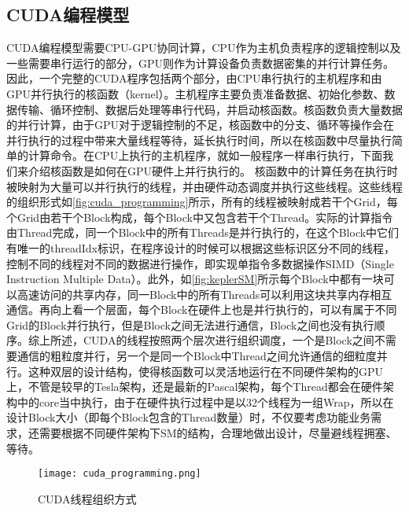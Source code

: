 \subsection{CUDA编程模型}
CUDA编程模型需要CPU-GPU协同计算，CPU作为主机负责程序的逻辑控制以及一些需要串行运行的部分，GPU则作为计算设备负责数据密集的并行计算任务。因此，一个完整的CUDA程序包括两个部分，由CPU串行执行的主机程序和由GPU并行执行的核函数（kernel）。主机程序主要负责准备数据、初始化参数、数据传输、循环控制、数据后处理等串行代码，并启动核函数。核函数负责大量数据的并行计算，由于GPU对于逻辑控制的不足，核函数中的分支、循环等操作会在并行执行的过程中带来大量线程等待，延长执行时间，所以在核函数中尽量执行简单的计算命令。在CPU上执行的主机程序，就如一般程序一样串行执行，下面我们来介绍核函数是如何在GPU硬件上并行执行的。
核函数中的计算任务在执行时被映射为大量可以并行执行的线程，并由硬件动态调度并执行这些线程。这些线程的组织形式如\autoref{fig:cuda_programming}所示，所有的线程被映射成若干个Grid，每个Grid由若干个Block构成，每个Block中又包含若干个Thread。实际的计算指令由Thread完成，同一个Block中的所有Threads是并行执行的，在这个Block中它们有唯一的threadIdx标识，在程序设计的时候可以根据这些标识区分不同的线程，控制不同的线程对不同的数据进行操作，即实现单指令多数据操作SIMD（Single Instruction Multiple Data）。此外，如\autoref{fig:keplerSM}所示每个Block中都有一块可以高速访问的共享内存，同一Block中的所有Threads可以利用这块共享内存相互通信。再向上看一个层面，每个Block在硬件上也是并行执行的，可以有属于不同Grid的Block并行执行，但是Block之间无法进行通信，Block之间也没有执行顺序。综上所述，CUDA的线程按照两个层次进行组织调度，一个是Block之间不需要通信的粗粒度并行，另一个是同一个Block中Thread之间允许通信的细粒度并行。这种双层的设计结构，使得核函数可以灵活地运行在不同硬件架构的GPU上，不管是较早的Tesla架构，还是最新的Pascal架构，每个Thread都会在硬件架构中的core当中执行，由于在硬件执行过程中是以32个线程为一组Wrap，所以在设计Block大小（即每个Block包含的Thread数量）时，不仅要考虑功能业务需求，还需要根据不同硬件架构下SM的结构，合理地做出设计，尽量避线程拥塞、等待。
\begin{figure}[htbp]
	\centering
	\texttt{[image: cuda\_programming.png]}
	\caption{CUDA线程组织方式}\label{fig:cuda_programming}
\end{figure}


